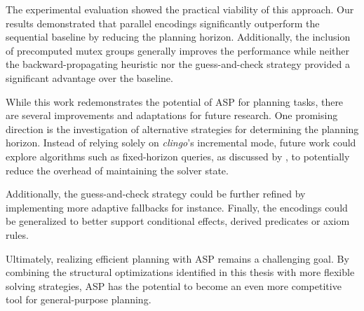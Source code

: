 \documentclass[
     11pt,                    %
     a4paper,             %
     BCOR=10mm,     %
     DIV=14,                 %
     listof=totoc,                    %
     bibliography=totoc,       %
     index=totoc,              %
     parskip            %
     twoside,
     headsepline
     ]{scrreprt}
\theoremstyle{definition}
\theoremstyle{definition}
\theoremstyle{remark}
\theoremstyle{bfnote}
\begin{document}
The experimental evaluation showed the practical viability of this approach. 
Our results demonstrated that parallel encodings significantly outperform the sequential baseline by reducing the planning horizon. Additionally, the inclusion of precomputed mutex groups generally improves the performance while neither the backward-propagating heuristic nor the guess-and-check strategy provided a significant advantage over the baseline. 

While this work redemonstrates the potential of ASP for planning tasks, there are several improvements and adaptations for future research.
One promising direction is the investigation of alternative strategies for determining the planning horizon. Instead of relying solely on \textit{clingo}'s incremental mode, future work could explore algorithms such as fixed-horizon queries, as discussed by \textcite{DIMOPOULOS_2019}, to potentially reduce the overhead of maintaining the solver state.

Additionally, the guess-and-check strategy could be further refined by implementing more adaptive fallbacks for instance.
Finally, the encodings could be generalized to better support conditional effects, derived predicates or axiom rules.

Ultimately, realizing efficient planning with ASP remains a challenging goal. By combining the structural optimizations identified in this thesis with more flexible solving strategies, ASP has the potential to become an even more competitive tool for general-purpose planning.
\printbibliography


\appendix

\end{document}
